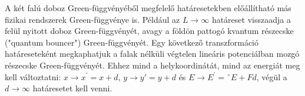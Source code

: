 A két falú doboz Green-függvényéből megfelelő határesetekben előállítható más fizikai rendszerek Green-függvénye is. Például az $L\to\infty$ határeset visszaadja a felül nyitott doboz Green-függvényét, avagy a földön pattogó kvantum részecske ("quantum bouncer") Green-függvényét. Egy következő transzformáció határeseteként megkaphatjuk a falak nélküli végtelen lineáris potenciálban mozgó részecske Green-függvényét. Ehhez mind a helykoordinátát, mind az energiát meg kell változtatni: $x\to x^\prime=x+d$, $y\to y\prime=y+d$ és $E\to E^\prime=ˇE+Fd$, végül a $d\to\infty$ határesetet kell venni.